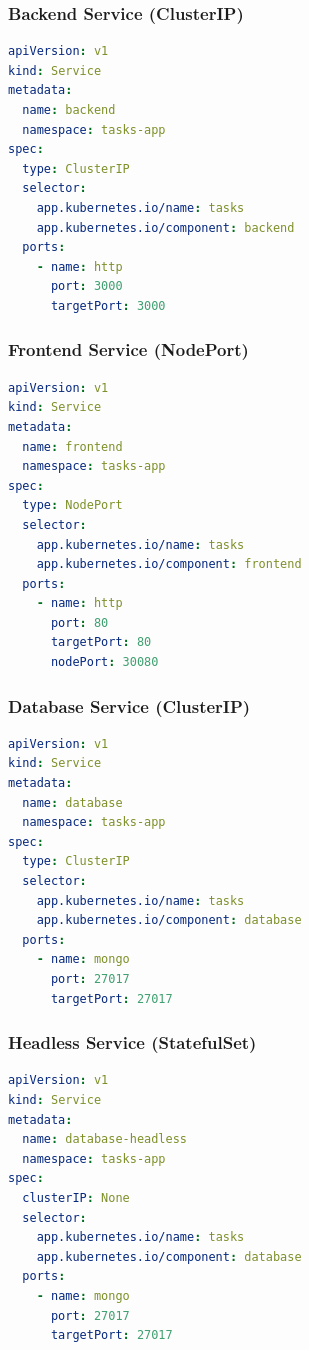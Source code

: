 \documentclass[12pt,a4paper]{report}
\begin{document}
\subsubsection{Backend Service (ClusterIP)}

\begin{lstlisting}[language=yaml,caption=backend-service.yaml]
apiVersion: v1
kind: Service
metadata:
  name: backend
  namespace: tasks-app
spec:
  type: ClusterIP
  selector:
    app.kubernetes.io/name: tasks
    app.kubernetes.io/component: backend
  ports:
    - name: http
      port: 3000
      targetPort: 3000
\end{lstlisting}

\subsubsection{Frontend Service (NodePort)}

\begin{lstlisting}[language=yaml,caption=frontend-service.yaml]
apiVersion: v1
kind: Service
metadata:
  name: frontend
  namespace: tasks-app
spec:
  type: NodePort
  selector:
    app.kubernetes.io/name: tasks
    app.kubernetes.io/component: frontend
  ports:
    - name: http
      port: 80
      targetPort: 80
      nodePort: 30080
\end{lstlisting}

\subsubsection{Database Service (ClusterIP)}

\begin{lstlisting}[language=yaml,caption=database-service.yaml]
apiVersion: v1
kind: Service
metadata:
  name: database
  namespace: tasks-app
spec:
  type: ClusterIP
  selector:
    app.kubernetes.io/name: tasks
    app.kubernetes.io/component: database
  ports:
    - name: mongo
      port: 27017
      targetPort: 27017
\end{lstlisting}

\subsubsection{Headless Service (StatefulSet)}

\begin{lstlisting}[language=yaml,caption=database-headless-service.yaml]
apiVersion: v1
kind: Service
metadata:
  name: database-headless
  namespace: tasks-app
spec:
  clusterIP: None
  selector:
    app.kubernetes.io/name: tasks
    app.kubernetes.io/component: database
  ports:
    - name: mongo
      port: 27017
      targetPort: 27017
\end{lstlisting}
\end{document}
